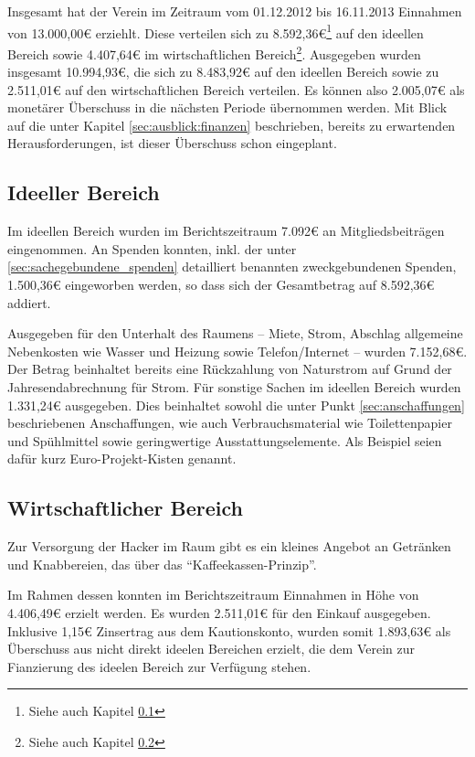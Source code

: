 \documentclass[10pt,DIV16]{scrartcl}
\begin{document}
Insgesamt hat der Verein im Zeitraum vom 01.12.2012 bis 16.11.2013 Einnahmen 
von 13.000,00\euro{} erziehlt. Diese verteilen sich zu 
8.592,36\euro\footnote{Siehe auch Kapitel \ref{sec:ideeller_bereich}} auf 
den ideellen Bereich sowie 4.407,64\euro{} im wirtschaftlichen 
Bereich\footnote{Siehe auch Kapitel \ref{sec:wirschaftlicher_bereich}}. 
Ausgegeben wurden insgesamt 10.994,93\euro, die sich zu 8.483,92\euro{} 
auf den ideellen Bereich sowie zu 2.511,01\euro{} auf den wirtschaftlichen 
Bereich verteilen. Es können also 2.005,07\euro{} als monetärer 
Überschuss in die nächsten Periode übernommen werden. Mit Blick auf die 
unter Kapitel \ref{sec:ausblick:finanzen} beschrieben, bereits zu 
erwartenden Herausforderungen, ist dieser Überschuss schon 
eingeplant.

\subsection{Ideeller Bereich}
\label{sec:ideeller_bereich}

Im ideellen Bereich wurden im Berichtszeitraum 7.092\euro{} an 
Mitgliedsbeiträgen eingenommen. An Spenden konnten, inkl. der unter 
\ref{sec:sachegebundene_spenden} detailliert benannten zweckgebundenen 
Spenden, 1.500,36\euro{} eingeworben werden, so dass sich der 
Gesamtbetrag auf 8.592,36\euro{} addiert.

Ausgegeben für den Unterhalt des Raumens -- Miete, Strom, Abschlag 
allgemeine Nebenkosten wie Wasser und Heizung sowie Telefon/Internet -- 
wurden 7.152,68\euro{}. Der Betrag beinhaltet bereits eine Rückzahlung 
von Naturstrom auf Grund der Jahresendabrechnung für Strom. Für 
sonstige Sachen im ideellen Bereich wurden 1.331,24\euro{} ausgegeben. 
Dies beinhaltet sowohl die unter Punkt \ref{sec:anschaffungen} beschriebenen 
Anschaffungen, wie auch Verbrauchsmaterial wie Toilettenpapier und 
Spühlmittel sowie geringwertige Ausstattungselemente. Als Beispiel 
seien dafür kurz Euro-Projekt-Kisten genannt. 


\subsection{Wirtschaftlicher Bereich}
\label{sec:wirschaftlicher_bereich}

Zur Versorgung der Hacker im Raum gibt es ein kleines Angebot an
Getränken und Knabbereien, das über das "`Kaffeekassen-Prinzip"'.

Im Rahmen dessen konnten im Berichtszeitraum Einnahmen in Höhe von 
4.406,49\euro{} erzielt werden. Es wurden 2.511,01\euro{} für den Einkauf 
ausgegeben. Inklusive 1,15\euro{} Zinsertrag aus dem Kautionskonto, 
wurden somit 1.893,63\euro{} als Überschuss aus nicht direkt ideelen 
Bereichen erzielt, die dem Verein zur Fianzierung des ideelen Bereich 
zur Verfügung stehen.
\end{document}
